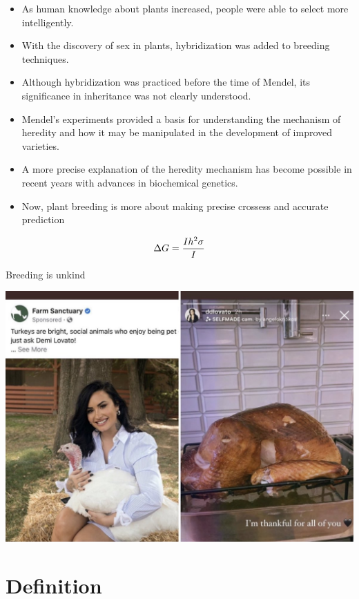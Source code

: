 \documentclass[11pt,ignorenonframetext,aspectratio=169]{beamer}
\providecommand{\tightlist}{%
  \setlength{\itemsep}{0pt}\setlength{\parskip}{0pt}}
\begin{document}
\begin{frame}{}
\protect\hypertarget{section-5}{}
\begin{itemize}
\tightlist
\item
  As human knowledge about plants increased, people were able to select
  more intelligently.
\item
  With the discovery of sex in plants, hybridization was added to
  breeding techniques.
\item
  Although hybridization was practiced before the time of Mendel, its
  significance in inheritance was not clearly understood.
\item
  Mendel's experiments provided a basis for understanding the mechanism
  of heredity and how it may be manipulated in the development of
  improved varieties.
\item
  A more precise explanation of the heredity mechanism has become
  possible in recent years with advances in biochemical genetics.
\item
  Now, plant breeding is more about making precise crossess and accurate
  prediction
\end{itemize}

\[\Large \Delta{G}=\frac{Ih^2 \sigma}{I}\]
\end{frame}

\begin{frame}{Breeding is unkind}
\protect\hypertarget{breeding-is-unkind}{}
\begin{center}\includegraphics[width=0.75\linewidth]{./images/breeding_is_unkind} \end{center}
\end{frame}

\hypertarget{definition}{%
\section{Definition}\label{definition}}
\end{document}
